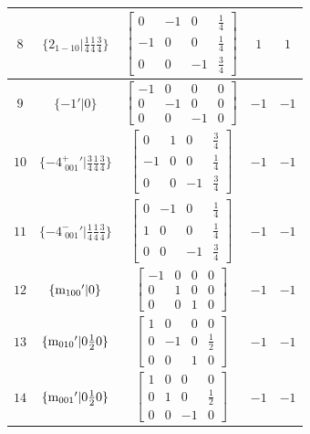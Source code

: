 \documentclass[fleqn,8pt]{jsarticle}
\begin{document}
\begin{longtable}{ccccc}
$ 8 $ & $ \{2{}_{1-10}|\frac{1}{4} \frac{1}{4} \frac{3}{4}\} $ & $ \begin{bmatrix} 0 & -1 & 0 & \frac{1}{4} \\ -1 & 0 & 0 & \frac{1}{4} \\ 0 & 0 & -1 & \frac{3}{4} \end{bmatrix} $ & $ 1 $ & $ 1 $ \\ \hline
$ 9 $ & $ \{-1{}'|0\} $ & $ \begin{bmatrix} -1 & 0 & 0 & 0 \\ 0 & -1 & 0 & 0 \\ 0 & 0 & -1 & 0 \end{bmatrix} $ & $ -1 $ & $ -1 $ \\ \hline
$ 10 $ & $ \{-4^{+}_{\,\,001}{}'|\frac{3}{4} \frac{1}{4} \frac{3}{4}\} $ & $ \begin{bmatrix} 0 & 1 & 0 & \frac{3}{4} \\ -1 & 0 & 0 & \frac{1}{4} \\ 0 & 0 & -1 & \frac{3}{4} \end{bmatrix} $ & $ -1 $ & $ -1 $ \\ \hline
$ 11 $ & $ \{-4^{-}_{\,\,001}{}'|\frac{1}{4} \frac{1}{4} \frac{3}{4}\} $ & $ \begin{bmatrix} 0 & -1 & 0 & \frac{1}{4} \\ 1 & 0 & 0 & \frac{1}{4} \\ 0 & 0 & -1 & \frac{3}{4} \end{bmatrix} $ & $ -1 $ & $ -1 $ \\ \hline
$ 12 $ & $ \{{\rm m}_{100}{}'|0\} $ & $ \begin{bmatrix} -1 & 0 & 0 & 0 \\ 0 & 1 & 0 & 0 \\ 0 & 0 & 1 & 0 \end{bmatrix} $ & $ -1 $ & $ -1 $ \\ \hline
$ 13 $ & $ \{{\rm m}_{010}{}'|0 \frac{1}{2} 0\} $ & $ \begin{bmatrix} 1 & 0 & 0 & 0 \\ 0 & -1 & 0 & \frac{1}{2} \\ 0 & 0 & 1 & 0 \end{bmatrix} $ & $ -1 $ & $ -1 $ \\ \hline
$ 14 $ & $ \{{\rm m}_{001}{}'|0 \frac{1}{2} 0\} $ & $ \begin{bmatrix} 1 & 0 & 0 & 0 \\ 0 & 1 & 0 & \frac{1}{2} \\ 0 & 0 & -1 & 0 \end{bmatrix} $ & $ -1 $ & $ -1 $ \\ \hline

\end{longtable}
\end{document}

